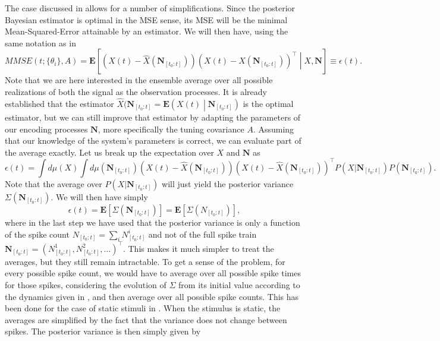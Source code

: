 The case discussed in  allows for a number of simplifications. Since the posterior Bayesian estimator is optimal in the MSE sense, its MSE will be the minimal Mean-Squared-Error attainable by an estimator. We will then have, using the same notation as in 
\[
MMSE(t;\{\theta_i\},A) = \boldsymbol{E}\left[\left(X(t) - \hat{X}(\boldsymbol{N}_{[t_0:t]})\right)\left(X(t) - \hat{X}(\boldsymbol{N}_{[t_0:t]})\right)^\top\middle| X, \boldsymbol{N}\right]\equiv \epsilon(t).
\]
Note that we are here interested in the ensemble average over all possible realizations of both the signal as the observation processes. It is already established that the estimator $\hat{X}(\boldsymbol{N}_{[t_0:t]} = \boldsymbol{E}\left(X(t)\middle|\boldsymbol{N}_{[t_0:t]}\right)$ is the optimal estimator, but we can still improve that estimator by adapting the parameters of our encoding processes $\boldsymbol{N}$, more specifically the tuning covariance $A$. Assuming that our knowledge of the system's parameters is correct, we can evaluate part of the average exactly. Let us break up the expectation over $X$ and $\boldsymbol{N}$ as
\[
\epsilon(t) = \int d\mu(X) \int d\mu(\boldsymbol{N}_{[t_0:t]}) \left(X(t) - \hat{X}(\boldsymbol{N}_{[t_0:t]})\right)\left(X(t) - \hat{X}(\boldsymbol{N}_{[t_0:t]})\right)^\top P(X| \boldsymbol{N}_{[t_0:t]}) P(\boldsymbol{N}_{[t_0:t]}).
\]
Note that the average over $P(X|\boldsymbol{N}_{[t_0:t]})$ will just yield the posterior variance $\Sigma(\boldsymbol{N}_{[t_0:t]})$. We will then have simply
\[
\epsilon(t) = \boldsymbol{E}\left[\Sigma(\boldsymbol{N}_{[t_0:t]})\right] = \boldsymbol{E}\left[\Sigma(N_{[t_0:t]})\right],
\]
where in the last step we have used that the posterior variance is only a function of the spike count $N_{[t_0:t]} = \sum_i N^i_{[t_0:t]}$ and not of the full spike train $\boldsymbol{N}_{[t_0:t]} = \left(N^1_{[t_0:t]}, N^2_{[t_0:t]}, \ldots\right)^\top$. This makes it much simpler to treat the averages, but they still remain intractable. To get a sense of the problem, for every possible spike count, we would have to average over all possible spike times for those spikes, considering the evolution of $\Sigma$ from its initial value according to the dynamics given in , and then average over all possible spike counts. This has been done for the case of static stimuli in \citet{Yaeli2010}. When the stimulus is static, the averages are simplified by the fact that the variance does not change between spikes. The posterior variance is then simply given by
